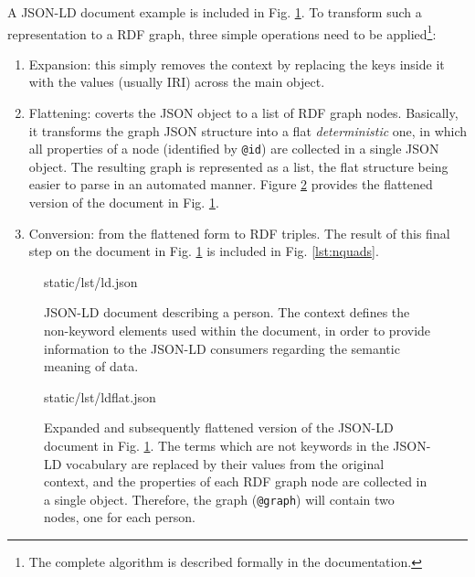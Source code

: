 A JSON-LD document example is included in Fig. \ref{lst:jsonld}. To transform
such a representation to a RDF graph, three simple operations need to be
applied\footnote{The complete algorithm is described formally in the
documentation.}:
\begin{enumerate}
  \item Expansion: this simply removes the context by replacing the keys inside
                   it with the values (usually IRI) across the main object.
  \item Flattening: coverts the JSON object to a list of RDF graph nodes.
                    Basically, it transforms the graph JSON structure into a
                    flat \textit{deterministic} one, in which all properties of
                    a node (identified by \texttt{@id}) are collected in a
                    single JSON object. The resulting graph is represented as
                    a list, the flat structure being easier to parse in an
                    automated manner. Figure \ref{lst:ldflat} provides the
                    flattened version of the document in Fig. \ref{lst:jsonld}.
  \item Conversion: from the flattened form to RDF triples. The result of this
                    final step on the document in Fig. \ref{lst:jsonld} is
                    included in Fig. \ref{lst:nquads}.
\end{enumerate}

\begin{figure}[!ht]
  
    {static/lst/ld.json}
    \caption[JSON-LD document describing a person]
            {JSON-LD document describing a person. The context defines the
             non-keyword elements used within the document, in order to provide
             information to the JSON-LD consumers regarding the semantic
             meaning of data.}
    \label{lst:jsonld}
\end{figure}

\begin{figure}[!ht]
  
    {static/lst/ldflat.json}
    \caption[Expanded and flattened JSON-LD document]
            {Expanded and subsequently flattened version of the JSON-LD document
             in Fig. \ref{lst:jsonld}. The terms which are not keywords in the
             JSON-LD vocabulary are replaced by their values from the original
             context, and the properties of each RDF graph node are collected in
             a single object. Therefore, the graph (\texttt{@graph}) will
             contain two nodes, one for each person.}
    \label{lst:ldflat}
\end{figure}

